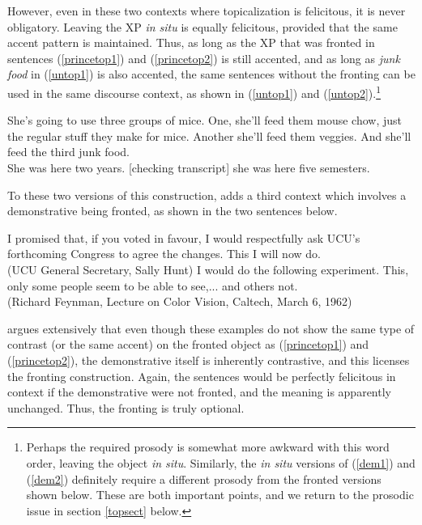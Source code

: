 However, even in these two contexts where topicalization is felicitous, it is never obligatory.
Leaving the XP \textsl{in situ} is equally felicitous, provided that the same accent pattern is maintained.
Thus, as long as the XP that was fronted in sentences (\ref{princetop1}) and (\ref{princetop2}) is still accented, and as long as \textsl{junk food} in (\ref{untop1}) is also accented, the same sentences without the fronting can be used in the same discourse context, as shown in (\ref{untop1}) and (\ref{untop2}).\footnote{Perhaps the required prosody is somewhat more awkward with this word order, leaving the object \textsl{in situ}.
Similarly, the \textsl{in situ} versions of (\ref{dem1}) and (\ref{dem2}) definitely require a different prosody from the fronted versions shown below.
These are both important points, and we return to the prosodic issue in section \ref{topsect} below.} 

\begin{exe}
\ex \label{untop1} She's going to use three groups of mice.
One, she'll feed them mouse chow, just the regular stuff they make for
mice.
Another she'll feed them veggies.
And she'll feed the third junk food.\\

\ex \label{untop2} She was here two years.
[checking transcript] she was here five semesters.\\
\citep[Adapted from][8,9]{prince1999}
\end{exe}


To these two versions of this construction, \citet{caitldiss} adds a third context which involves a demonstrative being fronted, as shown in the two sentences below.


\begin{exe}
\ex \label{dem1} I promised that, if you voted in favour, I would respectfully ask UCU's forthcoming Congress to agree the changes.
This I will now do.\\
(UCU General Secretary, Sally Hunt)
\ex \label{dem2} I would do the following experiment.
This, only some people seem to be able to see,... and others not.\\
(Richard Feynman, Lecture on Color Vision, Caltech, March 6, 1962)
\end{exe}

\noindent \citet{caitldiss} argues extensively that even though these examples do not show the same type of contrast (or the same accent) on the fronted object as (\ref{princetop1}) and (\ref{princetop2}), the demonstrative itself is inherently contrastive, and this licenses the fronting construction.
Again, the sentences would be perfectly felicitous in context if the demonstrative were not fronted, and the meaning is apparently unchanged.
Thus, the fronting is truly optional.

